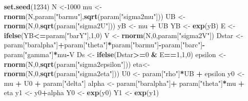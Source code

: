 \documentclass[]{book}
\newenvironment{Shaded}{\begin{snugshade}}{\end{snugshade}}
\newcommand{\KeywordTok}[1]{\textcolor[rgb]{0.13,0.29,0.53}{\textbf{#1}}}
\newcommand{\DecValTok}[1]{\textcolor[rgb]{0.00,0.00,0.81}{#1}}
\newcommand{\StringTok}[1]{\textcolor[rgb]{0.31,0.60,0.02}{#1}}
\newcommand{\OperatorTok}[1]{\textcolor[rgb]{0.81,0.36,0.00}{\textbf{#1}}}
\newcommand{\NormalTok}[1]{#1}
\theoremstyle{definition}
\theoremstyle{definition}
\theoremstyle{definition}
\theoremstyle{remark}
\begin{document}
\begin{Shaded}
\begin{Highlighting}[]
\KeywordTok{set.seed}\NormalTok{(}\DecValTok{1234}\NormalTok{)}
\NormalTok{N <-}\DecValTok{1000}
\NormalTok{mu <-}\StringTok{ }\KeywordTok{rnorm}\NormalTok{(N,param[}\StringTok{"barmu"}\NormalTok{],}\KeywordTok{sqrt}\NormalTok{(param[}\StringTok{"sigma2mu"}\NormalTok{]))}
\NormalTok{UB <-}\StringTok{ }\KeywordTok{rnorm}\NormalTok{(N,}\DecValTok{0}\NormalTok{,}\KeywordTok{sqrt}\NormalTok{(param[}\StringTok{"sigma2U"}\NormalTok{]))}
\NormalTok{yB <-}\StringTok{ }\NormalTok{mu }\OperatorTok{+}\StringTok{ }\NormalTok{UB }
\NormalTok{YB <-}\StringTok{ }\KeywordTok{exp}\NormalTok{(yB)}
\NormalTok{E <-}\StringTok{ }\KeywordTok{ifelse}\NormalTok{(YB}\OperatorTok{<=}\NormalTok{param[}\StringTok{"barY"}\NormalTok{],}\DecValTok{1}\NormalTok{,}\DecValTok{0}\NormalTok{)}
\NormalTok{V <-}\StringTok{ }\KeywordTok{rnorm}\NormalTok{(N,}\DecValTok{0}\NormalTok{,param[}\StringTok{"sigma2V"}\NormalTok{])}
\NormalTok{Dstar <-}\StringTok{ }\NormalTok{param[}\StringTok{"baralpha"}\NormalTok{]}\OperatorTok{+}\NormalTok{param[}\StringTok{"theta"}\NormalTok{]}\OperatorTok{*}\NormalTok{param[}\StringTok{"barmu"}\NormalTok{]}\OperatorTok{-}\NormalTok{param[}\StringTok{"barc"}\NormalTok{]}\OperatorTok{-}\NormalTok{param[}\StringTok{"gamma"}\NormalTok{]}\OperatorTok{*}\NormalTok{mu}\OperatorTok{-}\NormalTok{V}
\NormalTok{Ds <-}\StringTok{ }\KeywordTok{ifelse}\NormalTok{(Dstar}\OperatorTok{>=}\DecValTok{0} \OperatorTok{&}\StringTok{ }\NormalTok{E}\OperatorTok{==}\DecValTok{1}\NormalTok{,}\DecValTok{1}\NormalTok{,}\DecValTok{0}\NormalTok{)}
\NormalTok{epsilon <-}\StringTok{ }\KeywordTok{rnorm}\NormalTok{(N,}\DecValTok{0}\NormalTok{,}\KeywordTok{sqrt}\NormalTok{(param[}\StringTok{"sigma2epsilon"}\NormalTok{]))}
\NormalTok{eta<-}\StringTok{ }\KeywordTok{rnorm}\NormalTok{(N,}\DecValTok{0}\NormalTok{,}\KeywordTok{sqrt}\NormalTok{(param[}\StringTok{"sigma2eta"}\NormalTok{]))}
\NormalTok{U0 <-}\StringTok{ }\NormalTok{param[}\StringTok{"rho"}\NormalTok{]}\OperatorTok{*}\NormalTok{UB }\OperatorTok{+}\StringTok{ }\NormalTok{epsilon}
\NormalTok{y0 <-}\StringTok{ }\NormalTok{mu }\OperatorTok{+}\StringTok{  }\NormalTok{U0 }\OperatorTok{+}\StringTok{ }\NormalTok{param[}\StringTok{"delta"}\NormalTok{]}
\NormalTok{alpha <-}\StringTok{ }\NormalTok{param[}\StringTok{"baralpha"}\NormalTok{]}\OperatorTok{+}\StringTok{  }\NormalTok{param[}\StringTok{"theta"}\NormalTok{]}\OperatorTok{*}\NormalTok{mu }\OperatorTok{+}\StringTok{ }\NormalTok{eta}
\NormalTok{y1 <-}\StringTok{ }\NormalTok{y0}\OperatorTok{+}\NormalTok{alpha}
\NormalTok{Y0 <-}\StringTok{ }\KeywordTok{exp}\NormalTok{(y0)}
\NormalTok{Y1 <-}\StringTok{ }\KeywordTok{exp}\NormalTok{(y1)}
\end{Highlighting}
\end{Shaded}
\end{document}
